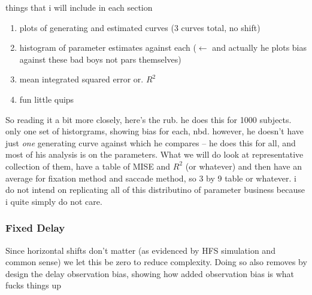 \documentclass{article}
\begin{document}
things that i will include in each section

\begin{singlespace}
\begin{enumerate}
\vspace{-3mm}
\item plots of generating and estimated curves (3 curves total, no shift)
\item histogram of parameter estimates against each ($\leftarrow$ and actually he plots bias against these bad boys not pars themselves)
\item mean integrated squared error or. $R^2$
\item fun little quips
\end{enumerate}
\end{singlespace}

So reading it a bit more closely, here's the rub. he does this for 1000 subjects. only one set of historgrams, showing bias for each, nbd. however, he doesn't have just \textit{one} generating curve against which he compares -- he does this for all, and most of his analysis is on the parameters. What we will do look at representative collection of them, have a table of MISE and $R^2$ (or whatever) and then have an average for fixation method and saccade method,  so 3 by 9 table or whatever. i do not intend on replicating all of this distributino of parameter business because i quite simply do not care.

\subsubsection{Fixed Delay}

Since horizontal shifts don't matter (as evidenced by HFS simulation and common sense) we let this be zero to reduce complexity. Doing so also removes by design the delay observation bias, showing how added observation bias is what fucks things up
\end{document}
